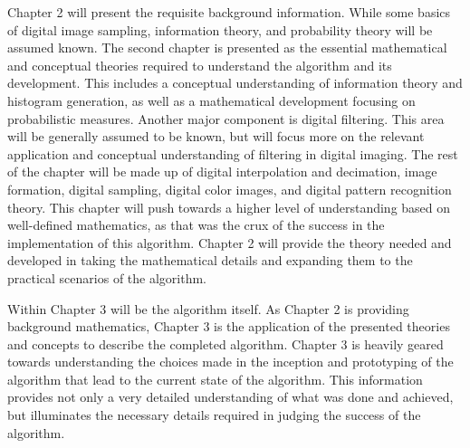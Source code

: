 %
%
%
%
%
%
%
%
%

%
%
%



Chapter 2 will present the requisite background information. While some basics of digital image sampling, information theory, and probability theory will be assumed known. The second chapter is presented as the essential mathematical and conceptual theories required to understand the algorithm and its development. This includes a conceptual understanding of information theory and histogram generation, as well as a mathematical development focusing on probabilistic measures. Another major component is digital filtering. This area will be generally assumed to be known, but will focus more on the relevant application and conceptual understanding of filtering in digital imaging. The rest of the chapter will be made up of digital interpolation and decimation, image formation, digital sampling, digital color images, and digital pattern recognition theory. This chapter will push towards a higher level of understanding based on well-defined mathematics, as that was the crux of the success in the implementation of this algorithm. Chapter 2 will provide the theory needed and developed in taking the mathematical details and expanding them to the practical scenarios of the algorithm.

Within Chapter 3 will be the algorithm itself. As Chapter 2 is providing background mathematics, Chapter 3 is the application of the presented theories and concepts to describe the completed algorithm. Chapter 3 is heavily geared towards understanding the choices made in the inception and prototyping of the algorithm that lead to the current state of the algorithm. This information provides not only a very detailed understanding of what was done and achieved, but illuminates the necessary details required in judging the success of the algorithm.

